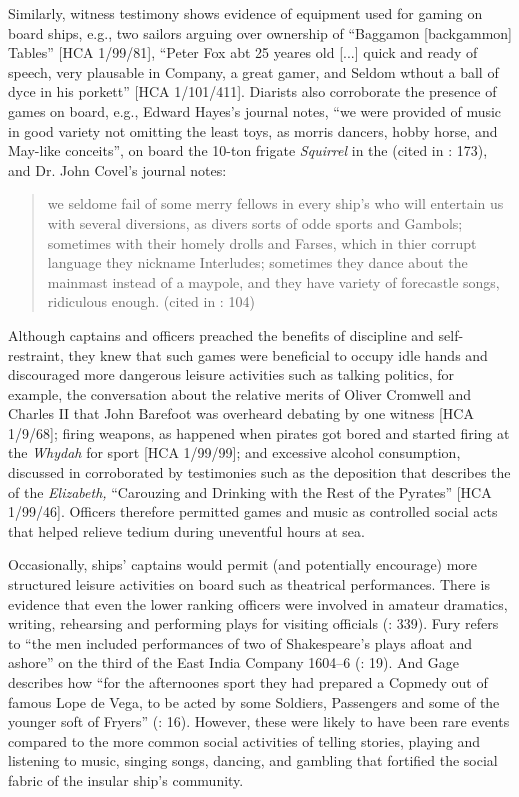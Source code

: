 Similarly, witness testimony shows evidence of equipment used for gaming on board ships, e.g., two sailors arguing over ownership of “Baggamon [backgammon] Tables” [HCA 1/99/81], “Peter Fox abt 25 yeares old [...] quick and ready of speech, very plausable in Company, a great gamer, and Seldom wthout a ball of dyce in his porkett” [HCA 1/101/411]. Diarists also corroborate the presence of games on board, e.g., Edward Hayes’s  journal notes, “we were provided of music in good variety not omitting the least toys, as morris dancers, hobby horse, and May-like conceits”, on board the 10-ton frigate \textit{Squirrel} in the  (cited in \citealt{Bicheno2012}: 173), and Dr. John Covel’s  journal notes:

\begin{quotation}
we seldome fail of some merry fellows in every ship’s  who will entertain us with several diversions, as divers sorts of odde sports and Gambols; sometimes with their homely drolls and Farses, which in thier corrupt language they nickname Interludes; sometimes they dance about the mainmast instead of a maypole, and they have variety of forecastle songs, ridiculous enough. (cited in \citealt{Palmer1986}: 104) \end{quotation}

Although captains and officers preached the benefits of discipline and self-restraint, they knew that such games were beneficial to occupy idle hands and discouraged more dangerous leisure activities such as talking politics, for example, the conversation about the relative merits of Oliver Cromwell and Charles II that John Barefoot was overheard debating by one witness [HCA 1/9/68]; firing weapons, as happened when pirates got bored and started firing at the \textit{Whydah} for sport [HCA 1/99/99]; and excessive alcohol consumption, discussed in  corroborated by testimonies such as the deposition that describes the  of the \textit{Elizabeth,} “Carouzing and Drinking with the Rest of the Pyrates” [HCA 1/99/46]. Officers therefore permitted games and music as controlled social acts that helped relieve tedium during uneventful hours at sea. 

Occasionally, ships’ captains would permit (and potentially encourage) more structured leisure activities on board such as theatrical performances. There is evidence that even the lower ranking officers were involved in amateur dramatics, writing, rehearsing and performing plays for visiting officials (\citealt{AdkinsAdkins2008}: 339). Fury refers to “the men included performances of two of Shakespeare’s plays afloat and ashore” on the third  of the East India Company {1604}–6 (\citealt{Fury2015}: 19). And Gage describes how “for the afternoones sport they had prepared a Copmedy out of famous Lope de Vega, to be acted by some Soldiers, Passengers and some of the younger soft of Fryers” (\citealt{Gage1648}: 16). However, these were likely to have been rare events compared to the more common social activities of telling stories, playing and listening to music, singing songs, dancing, and gambling that fortified the social fabric of the insular ship’s community. 

